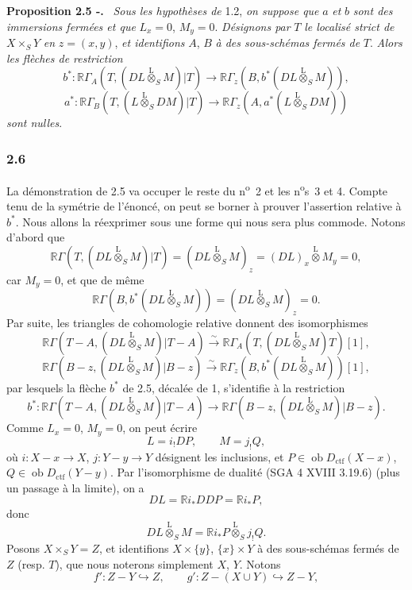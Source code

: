 \documentclass[11pt]{article}
\newenvironment{statement}[1]{\par\medskip\noindent\textbf{#1.}\ }{\par\medskip}
\newcommand{\R}{\mathbb{R}}\newcommand{\RHomCore}{\mathbb{R}\mathrm{Hom}}
\providecommand{\lten}{\overset{\mathrm L}{\otimes}}
\providecommand{\Ob}{\operatorname{ob}}
\providecommand{\lten}{\overset{\mathrm L}{\otimes}}
\providecommand{\lten}{\overset{\mathrm L}{\otimes}}
\providecommand{\Ob}{\operatorname{ob}}
\providecommand{\R}{\mathrm R}
\providecommand{\lten}{\overset{\mathrm L}{\otimes}}
\providecommand{\lten}{\overset{\mathrm L}{\otimes}}
\providecommand{\Ob}{\operatorname{Ob}}
\providecommand{\lten}{\overset{\mathrm L}{\otimes}}
\providecommand{\Ob}{\operatorname{ob}}
\providecommand{\Ob}{\operatorname{Ob}}
\providecommand{\lten}{\overset{\mathrm L}{\otimes}}
\begin{document}
\begin{statement}{Proposition 2.5 -}
\emph{Sous les hypothèses de} 1.2, \emph{on suppose que} $a$ \emph{et} $b$ \emph{sont des immersions fermées et que} $L_x=0$, $M_y=0$. \emph{Désignons par} $T$ \emph{le localisé strict de} $X\times_SY$ \emph{en} $z=(x,y)$, \emph{et identifions} $A$, $B$ \emph{à des sous-schémas fermés de} $T$. \emph{Alors les flèches de restriction}
\[
b^*:\R\Gamma_A(T,(DL\lten_SM)|T)
 \longrightarrow \R\Gamma_z(B,b^*(DL\lten_SM)),
\]
\[
a^*:\R\Gamma_B(T,(L\lten_SDM)|T)
 \longrightarrow \R\Gamma_z(A,a^*(L\lten_SDM))
\]
\emph{sont nulles}.
\end{statement}

\subsubsection*{2.6}
La démonstration de 2.5 va occuper le reste du n\textsuperscript{o}~2 et les n\textsuperscript{o}s~3 et 4. Compte tenu de la symétrie de l'énoncé, on peut se borner à prouver l'assertion relative à $b^*$. Nous allons la réexprimer sous une forme qui nous sera plus commode. Notons d'abord que
\[
\R\Gamma(T,(DL\lten_SM)|T)
 =(DL\lten_SM)_z
 =(DL)_x\lten M_y=0,
\]
car $M_y=0$, et que de même
\[
\R\Gamma(B,b^*(DL\lten_SM))
 =(DL\lten_SM)_z=0.
\]
Par suite, les triangles de cohomologie relative donnent des isomorphismes
\[
\R\Gamma(T-A,(DL\lten_SM)|T-A)
 \xrightarrow{\sim}
\R\Gamma_A(T,(DL\lten_SM)T)[1],
\]
\[
\R\Gamma(B-z,(DL\lten_SM)|B-z)
 \xrightarrow{\sim}
\R\Gamma_z(B,b^*(DL\lten_SM))[1],
\]
par lesquels la flèche $b^*$ de 2.5, décalée de 1, s'identifie à la restriction
\begin{equation}
b^*:\R\Gamma(T-A,(DL\lten_SM)|T-A)
 \longrightarrow \R\Gamma(B-z,(DL\lten_SM)|B-z).
\tag{2.6.1}
\end{equation}
Comme $L_x=0$, $M_y=0$, on peut écrire
\begin{equation}
L=i_!DP,\qquad M=j_!Q,
\tag{2.6.2}
\end{equation}
où $i:X-x\to X$, $j:Y-y\to Y$
désignent les inclusions, et $P\in\Ob D_{\mathrm{ctf}}(X-x)$, $Q\in\Ob D_{\mathrm{ctf}}(Y-y)$. Par l'isomorphisme de dualité (SGA 4 XVIII 3.19.6) (plus un passage à la limite), on a
\[
DL=\R i_*DDP=\R i_*P,
\]
donc
\[
DL\lten_SM=\R i_*P\lten_Sj_!Q.
\]
Posons $X\times_SY=Z$, et identifions $X\times\{y\}$, $\{x\}\times Y$ à des sous-schémas fermés de $Z$ (resp. $T$), que nous noterons simplement $X$, $Y$. Notons
\[
f':Z-Y\hookrightarrow Z,\qquad
g':Z-(X\cup Y)\hookrightarrow Z-Y,
\]
\end{document}

